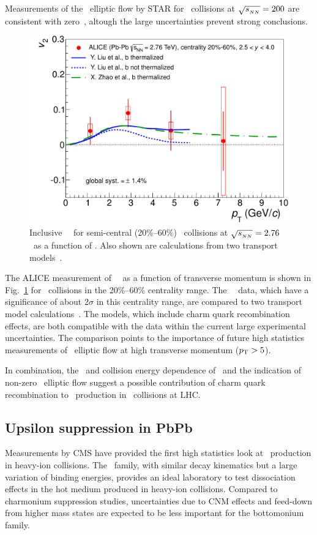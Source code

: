 Measurements of the \jpsi\ elliptic flow by STAR for \AuAu\ collisions at $\sqrt{s_{_{NN}}} = 200$\GeV 
are consistent with zero~\cite{Adamczyk:2012pw}, altough the large uncertainties prevent strong conclusions.
\begin{figure}
\begin{center}
\includegraphics[width=0.49\linewidth]{qqbarfigures/prl_fig4-eps-converted-to.pdf}
\caption{\label{fig:GR:v2ptcomp} Inclusive \jpsi\ \vtwo\  
for semi-central (20\%--60\%) \PbPb\ collisions at $\sqrt{s_{_{NN}}} = 2.76$\TeV\ as a function of \pT. 
Also shown are calculations from two transport models~\cite{Liu:2009gx,Zhao:2012gc}.}
\end{center}
\end{figure}
The ALICE measurement of \jpsi\ \vtwo\ as a function of transverse momentum is shown in Fig.~\ref{fig:GR:v2ptcomp} for \PbPb\ collisions
in the 20\%--60\% centrality range.
The \jpsi\ \vtwo\ data, which have a significance of about 2$\sigma$ in this centrality range, are compared to two 
transport model calculations~\cite{Liu:2009gx,Zhao:2012gc}. The models, which include charm quark recombination effects, 
are both compatible with the data within the current large experimental uncertainties. The comparison points to the 
importance of future high statistics measurements of \jpsi\ elliptic flow at high transverse momentum ($\mbox{$p_{\mathrm{T}}$} > 5$\GeVc).

In combination, the \pT\ and collision energy dependence of \jpsi \Raa\ and the indication of non-zero \jpsi\ elliptic
flow suggest a possible  contribution of charm quark recombination to \jpsi\ production in \PbPb\ collisions
at LHC.

\subsection{Upsilon suppression in PbPb}

Measurements by CMS have provided the first high statistics look at \PgU\ production in heavy-ion collisions.
The \PgU\ family, with similar decay kinematics but a large variation of binding energies, 
provides an ideal laboratory to test dissociation effects in the hot medium produced in 
heavy-ion collisions. Compared to charmonium suppression studies, uncertainties due
to CNM effects and feed-down from higher mass states are expected to be 
less important for the bottomonium family.

